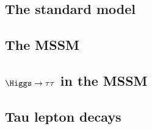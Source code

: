 \subsection*{The standard model}

\subsection*{The MSSM}

\subsection*{$\Higgs\to\tau\tau$ in the MSSM}

\subsection*{Tau lepton decays}
